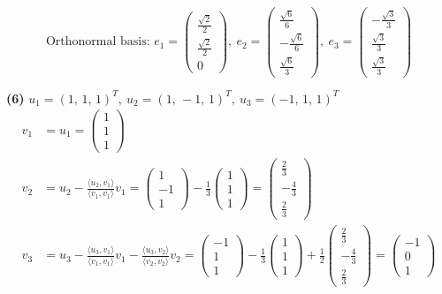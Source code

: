 \[ \text{Orthonormal basis: }e_1=\begin{pmatrix}\frac{\sqrt{2}}{2} \\ \frac{\sqrt{2}}{2} \\ 0\end{pmatrix},\ e_2=\begin{pmatrix}\frac{\sqrt{6}}{6} \\ - \frac{\sqrt{6}}{6} \\ \frac{\sqrt{6}}{3}\end{pmatrix},\ e_3=\begin{pmatrix}- \frac{\sqrt{3}}{3} \\ \frac{\sqrt{3}}{3} \\ \frac{\sqrt{3}}{3}\end{pmatrix} \]

\noindent\textbf{(6)} $u_1=(1,\,1,\,1)^T,\ u_2=(1,\,-1,\,1)^T,\ u_3=(-1,\,1,\,1)^T$
\begin{align*}
v_1&=u_1=\begin{pmatrix}1 \\ 1 \\ 1\end{pmatrix} \\
v_2&=u_2-\frac{\langle u_2,v_1\rangle}{\langle v_1,v_1\rangle}v_1=\begin{pmatrix}1 \\ -1 \\ 1\end{pmatrix}-\frac{1}{3}\begin{pmatrix}1 \\ 1 \\ 1\end{pmatrix}=\begin{pmatrix}\frac{2}{3} \\ - \frac{4}{3} \\ \frac{2}{3}\end{pmatrix} \\
v_3&=u_3-\frac{\langle u_3,v_1\rangle}{\langle v_1,v_1\rangle}v_1-\frac{\langle u_3,v_2\rangle}{\langle v_2,v_2\rangle}v_2=\begin{pmatrix}-1 \\ 1 \\ 1\end{pmatrix}-\frac{1}{3}\begin{pmatrix}1 \\ 1 \\ 1\end{pmatrix} +\frac{1}{2}\begin{pmatrix}\frac{2}{3} \\ - \frac{4}{3} \\ \frac{2}{3}\end{pmatrix}=\begin{pmatrix}-1 \\ 0 \\ 1\end{pmatrix}
\end{align*}
